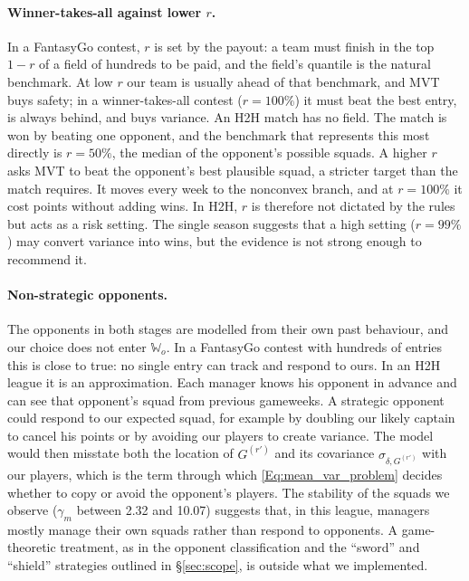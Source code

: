 \documentclass[12pt,oneside,a4paper]{book}
\theoremstyle{definition}
\theoremstyle{remark}
\begin{document}
	\paragraph{Winner-takes-all against lower $r$.} In a FantasyGo contest, $r$ is set by the
	payout: a team must finish in the top $1-r$ of a field of hundreds to be paid, and the field's
	quantile is the natural benchmark. At low $r$ our team is usually ahead of that benchmark, and
	MVT buys safety; in a winner-takes-all contest ($r=100\%$) it must beat the best entry, is
	always behind, and buys variance. An H2H match has no field. The match is won by beating one
	opponent, and the benchmark that represents this most directly is $r=50\%$, the median of the
	opponent's possible squads. A higher $r$ asks MVT to beat the opponent's best plausible squad,
	a stricter target than the match requires. It moves every week to the nonconvex branch, and at
	$r=100\%$ it cost points without adding wins. In H2H, $r$ is therefore not dictated by the
	rules but acts as a risk setting. The single season suggests that a high setting ($r=99\%$) may
	convert variance into wins, but the evidence is not strong enough to recommend it.

	\paragraph{Non-strategic opponents.} The opponents in both stages are modelled from their own
	past behaviour, and our choice does not enter $\mathbb{W}_o$. In a FantasyGo contest with
	hundreds of entries this is close to true: no single entry can track and respond to ours. In an
	H2H league it is an approximation. Each manager knows his opponent in advance and can see that
	opponent's squad from previous gameweeks. A strategic opponent could respond to our expected
	squad, for example by doubling our likely captain to cancel his points or by avoiding our
	players to create variance. The model would then misstate both the location of $G^{(r')}$ and
	its covariance $\sigma_{\delta,G^{(r')}}$ with our players, which is the term through which
	\eqref{Eq:mean_var_problem} decides whether to copy or avoid the opponent's players. The stability of the squads we
	observe ($\gamma_m$ between 2.32 and 10.07) suggests that, in this league, managers mostly
	manage their own squads rather than respond to opponents. A game-theoretic treatment, as in the
	opponent classification and the ``sword'' and ``shield'' strategies outlined in \S\ref{sec:scope}, is
	outside what we implemented.
\end{document}
